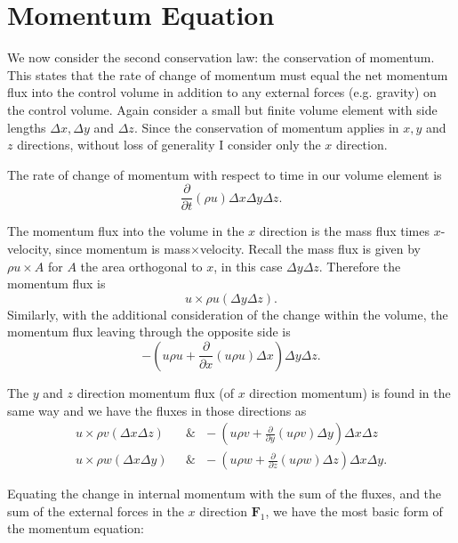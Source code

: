 \documentclass[12pt]{report}
\begin{document}
\section{Momentum Equation}

We now consider the second conservation law: the conservation of momentum.
This states that the rate of change of momentum must equal the net momentum flux into the control volume in addition to any external forces (e.g. gravity) on the control volume.
Again consider a small but finite volume element with side lengths $\Delta x, \Delta y$ and $\Delta z$.
Since the conservation of momentum applies in $x,y$ and $z$ directions, without loss of generality I consider only the $x$ direction.

The rate of change of momentum with respect to time in our volume element is
\begin{equation*} \frac{\partial }{\partial t} \left ( \rho u \right) \Delta x \Delta y \Delta z .\end{equation*}

The momentum flux into the volume in the $x$ direction is the mass flux times $x$-velocity, since momentum is mass$\times$velocity.
Recall the mass flux is given by $\rho u \times A$ for $A$ the area orthogonal to $x$, in this case $\Delta y \Delta z$.
Therefore the momentum flux is
\begin{equation*} u \times \rho u (\Delta y \Delta z) .\end{equation*}
Similarly, with the additional consideration of the change within the volume, the momentum flux leaving through the opposite side is
\begin{equation*} - \left ( u\rho u + \frac{\partial}{\partial x} \left( u\rho u\right ) \Delta x \right ) \Delta y \Delta z .\end{equation*}

The $y$ and $z$ direction momentum flux (of $x$ direction momentum) is found in the same way and we have the fluxes in those directions as
\begin{align*} u \times \rho v (\Delta x \Delta z) & ~~~\& ~~~ - \left ( u\rho v + \frac{\partial}{\partial y} \left( u\rho v\right ) \Delta y \right ) \Delta x \Delta z \\
u \times \rho w (\Delta x \Delta y) & ~~~\& ~~~ - \left ( u\rho w + \frac{\partial}{\partial z} \left( u\rho w\right ) \Delta z \right ) \Delta x \Delta y . \end{align*}

Equating the change in internal momentum with the sum of the fluxes, and the sum of the external forces in the $x$ direction $\mathbf{F}_1$, we have the most basic form of the momentum equation:
\end{document}
